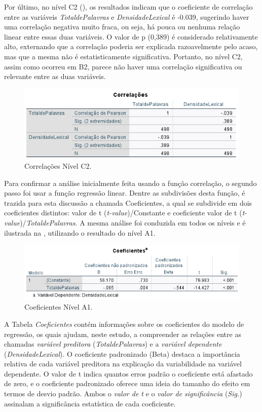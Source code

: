 \documentclass[portuguese]{textolivre}
\begin{document}
Por último, no nível C2 (), os resultados indicam que o coeficiente de correlação entre as variáveis \textit{TotaldePalavras} e \textit{DensidadeLexical} é -0.039, sugerindo haver uma correlação negativa muito fraca, ou seja, há pouca ou nenhuma relação linear entre essas duas variáveis. O valor de p (0,389) é considerado relativamente alto, externando que a correlação poderia ser explicada razoavelmente pelo acaso, mas que a mesma não é estatisticamente significativa. Portanto, no nível C2, assim como ocorreu em B2, parece não haver uma correlação significativa ou relevante entre as duas variáveis.

\begin{figure}[h!]
    \centering
    \includegraphics[width=0.8\linewidth]{Fig15.png}
    \caption{Correlações Nível C2.}
    \label{fig15}
\end{figure}

Para confirmar a análise inicialmente feita usando a função correlação, o segundo passo foi usar a função regressão linear. Dentre as subdivisões desta função, é trazida para esta discussão a chamada Coeficientes, a qual se subdivide em dois coeficientes distintos: valor de t (\textit{t-value})/Constante e coeficiente valor de t (\textit{t-value})/\textit{TotaldePalavras}. A mesma análise foi conduzida em todos os níveis e é ilustrada na , utilizando o resultado do nível A1.

\begin{figure}[h!]
    \centering
    \includegraphics[width=0.8\linewidth]{Fig16.png}
    \caption{Coeficientes Nível A1.}
    \label{fig16}
\end{figure}

A Tabela \textit{Coeficientes} contém informações sobre os coeficientes do modelo de regressão, os quais ajudam, neste estudo, a compreender as relações entre as chamadas \textit{variável preditora} (\textit{TotaldePalavras}) e a \textit{variável dependente} (\textit{DensidadeLexical}). O coeficiente padronizado (Beta) destaca a importância relativa de cada variável preditora na explicação da variabilidade na variável dependente. O valor de t indica quantos erros padrão o coeficiente está afastado de zero, e o coeficiente padronizado oferece uma ideia do tamanho do efeito em termos de desvio padrão. Ambos o \textit{valor de t} e o \textit{valor de significância} (\textit{Sig.}) assinalam a significância estatística de cada coeficiente.
\end{document}
